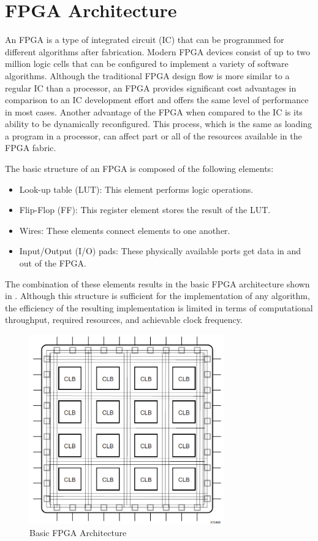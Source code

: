 \clearpage
\section{FPGA Architecture}   
An FPGA is a type of integrated circuit (IC) that can be programmed for different algorithms
after fabrication. Modern FPGA devices consist of up to two million logic cells that can be
configured to implement a variety of software algorithms. Although the traditional FPGA
design flow is more similar to a regular IC than a processor, an FPGA provides significant
cost advantages in comparison to an IC development effort and offers the same level of
performance in most cases. Another advantage of the FPGA when compared to the IC is its
ability to be dynamically reconfigured. This process, which is the same as loading a program
in a processor, can affect part or all of the resources available in the FPGA fabric.

\par The basic structure of an FPGA is composed of the following elements:
\begin{itemize}
  \item Look-up table (LUT): This element performs logic operations.
  \item Flip-Flop (FF): This register element stores the result of the LUT.
  \item Wires: These elements connect elements to one another.
  \item Input/Output (I/O) pads: These physically available ports get data in and out of the FPGA.
\end{itemize}

The combination of these elements results in the basic FPGA architecture shown in . 
Although this structure is sufficient for the implementation of any algorithm,
the efficiency of the resulting implementation is limited in terms of computational
throughput, required resources, and achievable clock frequency.

\begin{figure}[H]
  \begin{center}
      \includegraphics[width=0.75\textwidth]{images/FPGAArch.png}
      \caption{Basic FPGA Architecture}
      \label{FPGAArch}
  \end{center}
\end{figure}


